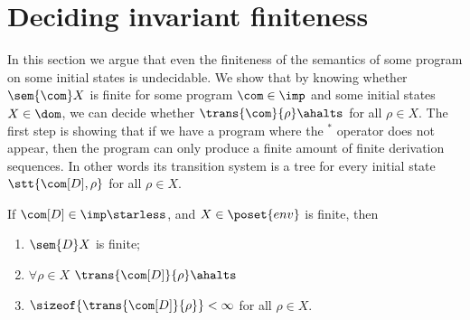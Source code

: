 \section{Deciding invariant finiteness}\label{sec:finiteness}

In this section we argue that even the finiteness of the semantics of
some program on some initial states is undecidable. We show that by
knowing whether \(\sem{\com}X\) is finite for some program
\(\com\in\imp\) and some initial states \(X\in \dom\), we can decide
whether \(\trans{\com}{\rho}\ahalts\) for all \(\rho \in X\). The first
step is showing that if we have a program where the \(^*\) operator
does not appear, then the program can only produce a finite amount of
finite derivation sequences. In other words its transition system is a tree for every
initial state \(\stt{\com[D], \rho}\) for all \(\rho \in X\).

\begin{lemma}\label{le:finiteness}
  If \(\com[D]\in\imp\starless\), and \(X \in \poset{env}\) is
  finite, then
  \begin{enumerate}[label=(\roman*).]
  \item \(\sem{D}X\) is finite;
  \item \(\forall \rho \in X\) \(\trans{\com[D]}{\rho}\ahalts\)
  \item \(\sizeof{\trans{\com[D]}{\rho}} < \infty\) for all
    \(\rho \in X\).
  \end{enumerate}
\end{lemma}

